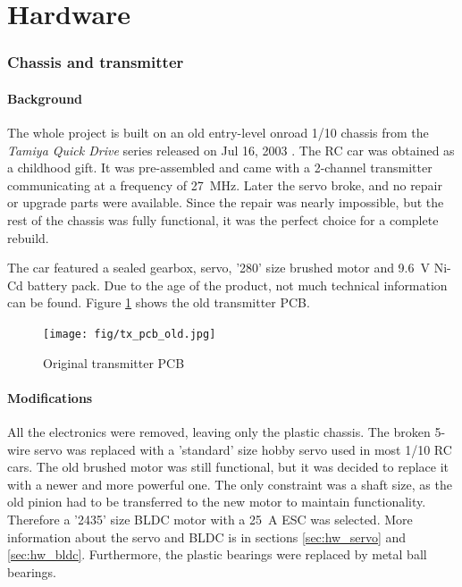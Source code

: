 


\part{Hardware}
\label{chap:hw}


\section{Chassis and transmitter}
\label{sec:hw_base}
\subsection{Background}
The whole project is built on an old entry-level onroad 1/10 chassis from the \textit{Tamiya Quick Drive} series released on Jul 16, 2003 \cite{tamiya}. The RC car was obtained as a childhood gift. It was pre-assembled and came with a 2-channel transmitter communicating at a frequency of \SI{27}{\MHz}. Later the servo broke, and no repair or upgrade parts were available. Since the repair was nearly impossible, but the rest of the chassis was fully functional, it was the perfect choice for a complete rebuild.

The car featured a sealed gearbox, servo, '280' size brushed motor and \SI{9.6}{\V} Ni-Cd battery pack. Due to the age of the product, not much technical information can be found. Figure \ref{fig:tx_old_pcb} shows the old transmitter PCB.
\begin{figure}[ht]
\centering
\texttt{[image: fig/tx\_pcb\_old.jpg]}
\caption{Original transmitter PCB}
\label{fig:tx_old_pcb}
\end{figure}

\subsection{Modifications}
\label{sub:hw_mods}
All the electronics were removed, leaving only the plastic chassis. The broken 5-wire servo was replaced with a 'standard' size hobby servo used in most 1/10 RC cars. The old brushed motor was still functional, but it was decided to replace it with a newer and more powerful one. The only constraint was a shaft size, as the old pinion had to be transferred to the new motor to maintain functionality. Therefore a '2435' size BLDC motor with a \SI{25}{\A} ESC was selected. More information about the servo and BLDC is in sections \ref{sec:hw_servo} and \ref{sec:hw_bldc}. Furthermore, the plastic bearings were replaced by metal ball bearings.

